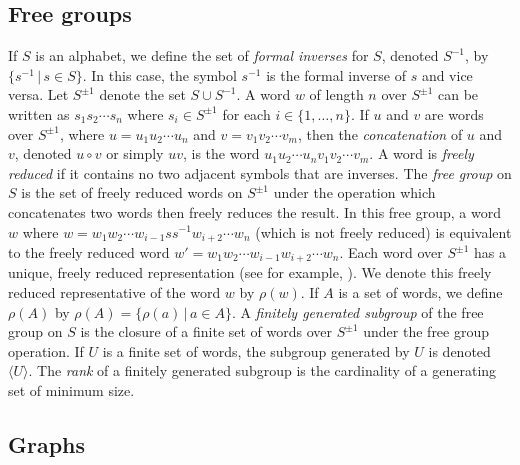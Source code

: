 \documentclass{article}
\newcommand{\gen}[1]{\langle #1 \rangle}
\newcommand{\Spm}{S^{\pm1}}
\begin{document}
\subsection{Free groups}

If $S$ is an alphabet, we define the set of \emph{formal inverses} for $S$, denoted $S^{-1}$, by $\{ s^{-1} \,|\, s \in S \}$.
In this case, the symbol $s^{-1}$ is the formal inverse of $s$ and vice versa.
Let $\Spm$ denote the set $S \cup S^{-1}$.
A word $w$ of length $n$ over $\Spm$ can be written as $s_1s_2\cdots s_n$ where $s_i \in \Spm$ for each $i \in \{1, \dotsc, n\}$.
If $u$ and $v$ are words over $\Spm$, where $u = u_1 u_2 \dotsb u_n$ and $v = v_1 v_2 \dotsb v_m$, then the \emph{concatenation} of $u$ and $v$, denoted $u \circ v$ or simply $uv$, is the word $u_1 u_2 \cdots u_n v_1 v_2 \cdots v_m$.
A word is \emph{freely reduced} if it contains no two adjacent symbols that are inverses.
The \emph{free group} on $S$ is the set of freely reduced words on $\Spm$ under the operation which concatenates two words then freely reduces the result.
In this free group, a word $w$ where $w = w_1 w_2 \cdots w_{i - 1} s s^{-1} w_{i + 2} \cdots w_n$ (which is not freely reduced) is equivalent to the freely reduced word $w' = w_1 w_2 \cdots w_{i - 1} w_{i + 2} \cdots w_n$.
Each word over $\Spm$ has a unique, freely reduced representation (see for example, \cite[Section~I.1]{ls77}).
We denote this freely reduced representative of the word $w$ by $\rho(w)$.
If $A$ is a set of words, we define $\rho(A)$ by $\rho(A) = \{ \rho(a) \, | \, a \in A\}$.
A \emph{finitely generated subgroup} of the free group on $S$ is the closure of a finite set of words over $\Spm$ under the free group operation.
If $U$ is a finite set of words, the subgroup generated by $U$ is denoted $\gen{U}$.
The \emph{rank} of a finitely generated subgroup is the cardinality of a generating set of minimum size.

\subsection{Graphs}
\end{document}

